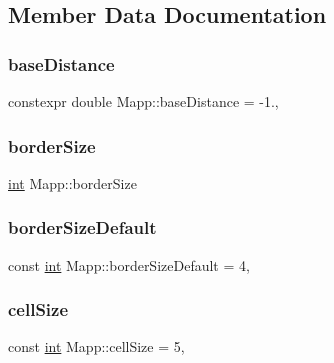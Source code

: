 \subsection{Member Data Documentation}
\mbox{\label{class_mapp_ae6b2f015604d9f3e34c7702aea081e08}} 
\subsubsection{\texorpdfstring{baseDistance}{baseDistance}}
{\footnotesize\ttfamily constexpr double Mapp\+::base\+Distance = -\/1.\hspace{0.3cm}{\ttfamily [static]}, {\ttfamily [protected]}}

\mbox{\label{class_mapp_a396e22007b8acd6231f9bd91d263f84f}} 
\subsubsection{\texorpdfstring{borderSize}{borderSize}}
{\footnotesize\ttfamily \mbox{\hyperlink{draw_8hh_aa620a13339ac3a1177c86edc549fda9b}{int}} Mapp\+::border\+Size\hspace{0.3cm}{\ttfamily [protected]}}

\mbox{\label{class_mapp_aef8bde83114714a4ce4ad9d13766e761}} 
\subsubsection{\texorpdfstring{borderSizeDefault}{borderSizeDefault}}
{\footnotesize\ttfamily const \mbox{\hyperlink{draw_8hh_aa620a13339ac3a1177c86edc549fda9b}{int}} Mapp\+::border\+Size\+Default = 4\hspace{0.3cm}{\ttfamily [static]}, {\ttfamily [protected]}}

\mbox{\label{class_mapp_a8216044ff8e95ba054985e26ae1c75f8}} 
\subsubsection{\texorpdfstring{cellSize}{cellSize}}
{\footnotesize\ttfamily const \mbox{\hyperlink{draw_8hh_aa620a13339ac3a1177c86edc549fda9b}{int}} Mapp\+::cell\+Size = 5\hspace{0.3cm}{\ttfamily [static]}, {\ttfamily [protected]}}

